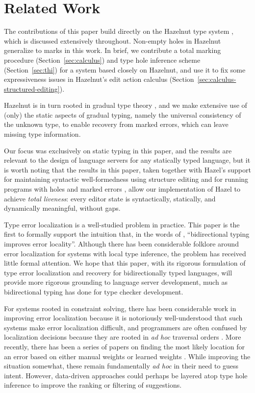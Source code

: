\section{Related Work}
\label{sec:related}

The contributions of this paper build directly on the Hazelnut type system \cite{HazelnutPOPL}, which is discussed extensively throughout. Non-empty holes in Hazelnut generalize to marks in this work. In brief, we contribute a total marking procedure (Section~\ref{sec:calculus}) and type hole inference scheme (Section~\ref{sec:thi}) for a system based closely on Hazelnut, and use it to fix some expressiveness issues in Hazelnut's edit action calculus (Section~\ref{sec:calculus-structured-editing}). 

Hazelnut is in turn rooted in gradual type theory \cite{Siek06a, siek2015refined}, and we make extensive use of (only) the static aspects of gradual typing, namely the universal consistency of the unknown type, to enable recovery from marked errors, which can leave missing type information.

Our focus was exclusively on static typing in this paper, and the results are relevant to the design of language servers for any statically typed language, but it is worth noting that the results in this paper, taken together with Hazel's support for maintaining syntactic well-formedness using structure editing \cite{DBLP:conf/vl/Moon023,moon2022tylr} and for running programs with holes and marked errors \cite{HazelLive}, allow our implementation of Hazel to achieve \emph{total liveness}: every editor state is syntactically, statically, and dynamically meaningful, without gaps.

Type error localization is a well-studied problem in practice. This paper is the first to formally support the intuition that, in the words of \cite{BidirTyping}, ``bidirectional typing improves error locality''. Although there has been considerable folklore around error localization 
for systems with local type inference, the problem has received little formal attention. We hope that this paper, with its rigorous formulation
of type error localization and recovery for bidirectionally typed languages, will provide more rigorous grounding to language server development,
much as bidirectional typing has done for type checker development.

For systems rooted in constraint solving, there has been considerable work in improving error localization because it is notoriously well-understood that such systems make error localization difficult, and programmers are often confused by localization decisions \cite{DBLP:conf/popl/Wand86} because they are rooted in \emph{ad hoc} traversal orders \cite{mcadam1998unification,DBLP:journals/toplas/LeeY98}. More recently, there has been a series of papers on finding the most likely location for an error based on either manual weights \cite{DBLP:conf/popl/ZhangM14,DBLP:conf/oopsla/PavlinovicKW14} or learned weights \cite{SeidelBlame}.
While improving the situation somewhat, these remain fundamentally \emph{ad hoc} in their need to guess intent. However, data-driven approaches could perhaps be layered atop type hole inference to improve the ranking or filtering of suggestions.

